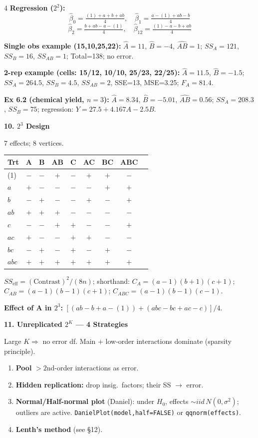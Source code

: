 \documentclass[7pt,letterpaper,landscape]{extarticle}
\newcommand{\secbar}[1]{%
  \vspace{2pt}%
  {\colorbox{black!80}{\parbox{\dimexpr\linewidth-2\fboxsep}{\color{white}\small\bfseries #1}}}\par%
  \vspace{1pt}%
}
\begin{document}
\begin{multicols*}{4}
\textbf{Regression ($2^2$):}
\[\hat\beta_0{=}\tfrac{(1)+a+b+ab}{4},\quad \hat\beta_1{=}\tfrac{a-(1)+ab-b}{4}\]
\[\hat\beta_2{=}\tfrac{b+ab-a-(1)}{4},\quad \hat\beta_{12}{=}\tfrac{(1)-a-b+ab}{4}\]

\textbf{Single obs example (15,10,25,22):}
$\hat A{=}11$, $\hat B{=}{-4}$, $\widehat{AB}{=}1$; $SS_A{=}121$, $SS_B{=}16$, $SS_{AB}{=}1$; Total=138; no error.

\textbf{2-rep example (cells: 15/12, 10/10, 25/23, 22/25):}
$\hat A{=}11.5$, $\hat B{=}{-1.5}$; $SS_A{=}264.5$, $SS_B{=}4.5$, $SS_{AB}{=}2$, SSE=13, MSE=3.25; $F_A{=}81.4$.

\textbf{Ex 6.2 (chemical yield, $n{=}3$):} $\hat A{=}8.34$, $\hat B{=}{-5.01}$, $\widehat{AB}{=}0.56$; $SS_A{=}208.3$, $SS_B{=}75$; regression: $Y{=}27.5{+}4.167A{-}2.5B$.

\secbar{10. $2^3$ Design}
7 effects; 8 vertices.

{\scriptsize
\begin{tabular}{@{}lcccccccc@{}}
\toprule
Trt & A & B & AB & C & AC & BC & ABC\\
\midrule
(1) & $-$ & $-$ & $+$ & $-$ & $+$ & $+$ & $-$\\
$a$   & $+$ & $-$ & $-$ & $-$ & $-$ & $+$ & $+$\\
$b$   & $-$ & $+$ & $-$ & $-$ & $+$ & $-$ & $+$\\
$ab$  & $+$ & $+$ & $+$ & $-$ & $-$ & $-$ & $-$\\
$c$   & $-$ & $-$ & $+$ & $+$ & $-$ & $-$ & $+$\\
$ac$  & $+$ & $-$ & $-$ & $+$ & $+$ & $-$ & $-$\\
$bc$  & $-$ & $+$ & $-$ & $+$ & $-$ & $+$ & $-$\\
$abc$ & $+$ & $+$ & $+$ & $+$ & $+$ & $+$ & $+$\\
\bottomrule
\end{tabular}\par}

$SS_{\text{eff}}{=}(\text{Contrast})^2/(8n)$; shorthand: $C_A{=}(a{-}1)(b{+}1)(c{+}1)$; $C_{AB}{=}(a{-}1)(b{-}1)(c{+}1)$; $C_{ABC}{=}(a{-}1)(b{-}1)(c{-}1)$.

\textbf{Effect of A in $2^3$:} $[(ab{-}b{+}a{-}(1)){+}(abc{-}bc{+}ac{-}c)]/4$.

\secbar{11. Unreplicated $2^K$ — 4 Strategies}
Large $K\Rightarrow$ no error df. Main + low-order interactions dominate (sparsity principle).
\begin{enumerate}[leftmargin=10pt]
\item \textbf{Pool} $>\!2$nd-order interactions as error.
\item \textbf{Hidden replication:} drop insig.\ factors; their SS $\to$ error.
\item \textbf{Normal/Half-normal plot} (Daniel): under $H_0$, effects $\sim iid\,N(0,\sigma^2)$; outliers are active. \texttt{DanielPlot(model,half=FALSE)} or \texttt{qqnorm(effects)}.
\item \textbf{Lenth's method} (see \S12).
\end{enumerate}


\end{multicols*}
\end{document}
